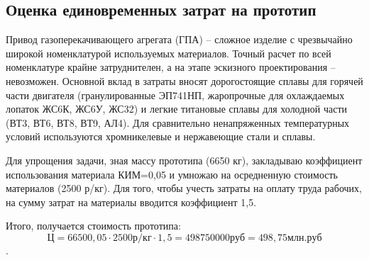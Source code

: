 \subsection{Оценка единовременных затрат на прототип}
Привод газоперекачивающего агрегата (ГПА) – сложное изделие с чрезвычайно широкой номенклатурой используемых материалов.
Точный расчет по всей номенклатуре крайне затруднителен, а на этапе эскизного проектирования – невозможен. Основной
вклад в затраты вносят дорогостоящие сплавы для горячей части двигателя (гранулированные ЭП741НП, жаропрочные для
охлаждаемых лопаток ЖС6К, ЖС6У, ЖС32) и легкие титановые сплавы для холодной части (ВТ3, ВТ6, ВТ8, ВТ9, АЛ4). Для
сравнительно ненапряженных температурных условий используются хромникелевые и нержавеющие стали и сплавы.

Для упрощения задачи, зная массу прототипа (6650 кг), закладываю коэффициент использования материала КИМ=0,05 и умножаю
на осредненную стоимость материалов (2500 р/кг). Для того, чтобы учесть затраты на оплату труда рабочих, на сумму затрат
на материалы вводится коэффициент 1,5.

Итого, получается стоимость прототипа:
$$
Ц = 66500,05 \cdot 2500 р/кг \cdot 1,5 = 498750000 руб = 498,75 млн.руб
$$.

